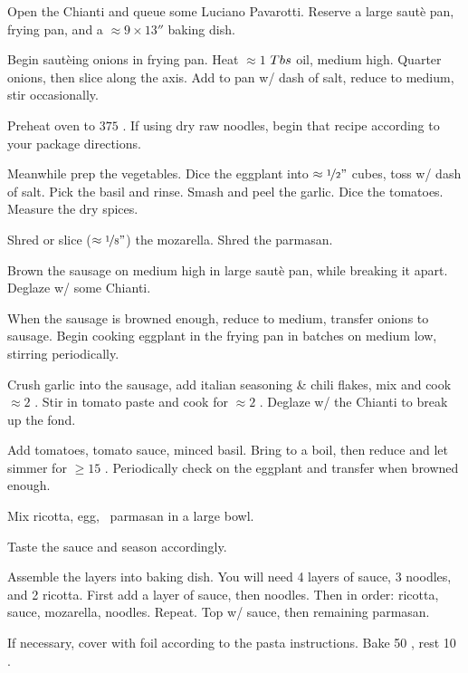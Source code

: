 \begin{preparation}
\item Open the Chianti and queue some Luciano Pavarotti.
	Reserve a large saut\`{e} pan, frying pan, and a $\approx 9\times13''$ baking dish.

\item Begin saut\`{e}ing onions in frying pan.
	Heat $\approx 1$ $Tbs$ oil, medium high.
	Quarter onions, then slice along the axis.
	Add to pan w/ dash of salt, reduce to medium, stir occasionally.

\item Preheat oven to $375$ \Fahrenheit.
	If using dry raw noodles, begin that recipe according to your package directions.

\item Meanwhile prep the vegetables.
	Dice the eggplant into $\approx \nicefrac{1}{2} "$ cubes, toss w/ dash of salt.
	Pick the basil and rinse.
	Smash and peel the garlic.
	Dice the tomatoes.
	Measure the dry spices.

\item Shred or slice ($\approx \nicefrac{1}{8} "$) the mozarella.
	Shred the parmasan.

\item Brown the sausage on medium high in large saut\`{e} pan, while breaking it apart.
	Deglaze w/ some Chianti.

\item When the sausage is browned enough, reduce to medium, transfer onions to sausage.
	Begin cooking eggplant in the frying pan in batches on medium low, stirring periodically.

\item Crush garlic into the sausage, add italian seasoning \& chili flakes, mix and cook $\approx 2$ \minute.
	Stir in tomato paste and cook for $\approx 2$ \minute.
	Deglaze w/ the Chianti to break up the fond.

\item Add tomatoes, tomato sauce, minced basil.
	Bring to a boil, then reduce and let simmer for $\geq 15$ \minute.
	Periodically check on the eggplant and transfer when browned enough.

\item Mix ricotta, egg, \onehalf~parmasan in a large bowl.

\item Taste the sauce and season accordingly.

\item Assemble the layers into baking dish.
	You will need 4 layers of sauce, 3 noodles, and 2 ricotta.
	First add a layer of sauce, then noodles.
	Then in order: ricotta, sauce, mozarella, noodles.
	Repeat.
	Top w/ sauce, then remaining parmasan.

\item If necessary, cover with foil according to the pasta instructions.
	Bake 50 \minute, rest 10 \minute.
\end{preparation}



